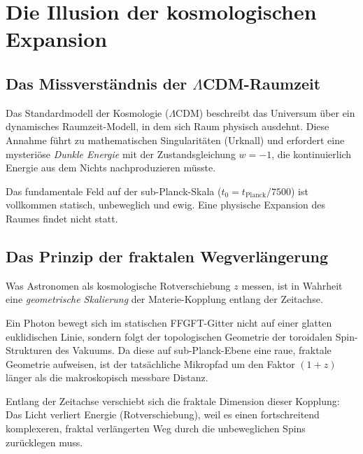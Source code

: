 \chapter{Die Illusion der kosmologischen Expansion}

\section{Das Missverständnis der \texorpdfstring{$\Lambda$CDM}{LCDM}-Raumzeit}

Das Standardmodell der Kosmologie ($\Lambda$CDM) beschreibt das Universum über
ein dynamisches Raumzeit-Modell, in dem sich Raum physisch ausdehnt.
Diese Annahme führt zu mathematischen Singularitäten (Urknall) und erfordert
eine mysteriöse \emph{Dunkle Energie} mit der Zustandsgleichung $w = -1$,
die kontinuierlich Energie aus dem Nichts nachproduzieren müsste.

\begin{important}
Das fundamentale Feld auf der sub-Planck-Skala
($t_0 = t_{\mathrm{Planck}}/7500$) ist vollkommen statisch, unbeweglich
und ewig. Eine physische Expansion des Raumes findet nicht statt.
\end{important}

\section{Das Prinzip der fraktalen Wegverlängerung}

Was Astronomen als kosmologische Rotverschiebung $z$ messen, ist in Wahrheit
eine \emph{geometrische Skalierung} der Materie-Kopplung entlang der Zeitachse.

\begin{keypoint}
Ein Photon bewegt sich im statischen FFGFT-Gitter nicht auf einer glatten
euklidischen Linie, sondern folgt der topologischen Geometrie der toroidalen
Spin-Strukturen des Vakuums. Da diese auf sub-Planck-Ebene eine raue, fraktale
Geometrie aufweisen, ist der tatsächliche Mikropfad um den Faktor $(1+z)$ länger
als die makroskopisch messbare Distanz.
\end{keypoint}

Entlang der Zeitachse verschiebt sich die fraktale Dimension dieser Kopplung:
Das Licht verliert Energie (Rotverschiebung), weil es einen fortschreitend
komplexeren, fraktal verlängerten Weg durch die unbeweglichen Spins zurücklegen
muss.

